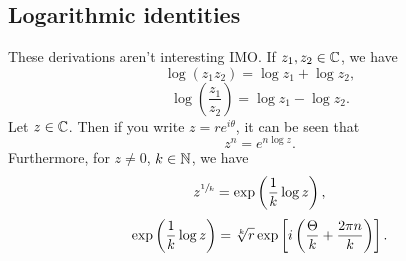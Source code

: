\subsection{Logarithmic identities}
These derivations aren't interesting IMO. If $z_1,z_2\in \mathbb{C}$, we have  
\begin{equation}
    \log(z_1z_2)=\log z_1+\log z_2,
\end{equation}
\begin{equation}
    \log\left( \frac{z_1}{z_2} \right) =\log z_1-\log z_2.
\end{equation}
Let $z\in \mathbb{C}$. Then if you write $z=re^{i\theta}$, it can be seen that
\begin{equation}
    z^{n}=e^{n\log z}.
\end{equation} Furthermore, for $z\neq 0$, $k\in \mathbb{N}$, we have 
\begin{equation}
    z^{\sfrac{1}{k}}=\exp\left( \frac{1}{k}\log z \right),
\end{equation}
\begin{equation}
    \exp\left( \frac{1}{k}\log z \right) = \sqrt[\leftroot{0}k]{r} \exp \left[ i\left( \frac{\Theta}{k}+\frac{2\pi n}{k} \right)  \right] .
\end{equation}
